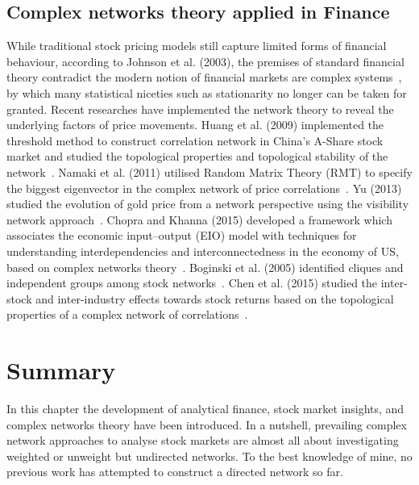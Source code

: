 
\subsection{Complex networks theory applied in Finance}
While traditional stock pricing models still capture limited forms of financial behaviour, according to Johnson et al. (2003), the premises of standard financial theory contradict the modern notion of financial markets are complex systems~\cite{financialcomplex}, by which many statistical niceties such as stationarity no longer can be taken for granted. Recent researches have implemented the network theory to reveal the underlying factors of price movements. Huang et al. (2009) implemented the threshold method to construct correlation network in China's A-Share stock market and studied the topological properties and topological stability of the network~\cite{chinesenetwork}. Namaki et al. (2011) utilised Random Matrix Theory (RMT) to specify the biggest eigenvector in the complex network of price correlations~\cite{genuine}. Yu (2013) studied the evolution of gold price from a network perspective using the visibility network approach~\cite{visibility}. Chopra and Khanna (2015) developed a framework which associates the economic input–output (EIO) model with techniques for understanding interdependencies and interconnectedness in the economy of US, based on complex networks theory~\cite{intercd}. Boginski et al. (2005) identified cliques and independent groups among stock networks~\cite{statisticalanalysis}.  Chen et al. (2015) studied the inter-stock and inter-industry effects towards stock returns based on the topological properties of a complex network of correlations~\cite{CHEN2015224}.

\section{Summary}
In this chapter the development of analytical finance, stock market insights, and complex networks theory have been introduced.
In a nutshell, prevailing complex network approaches to analyse stock markets are almost all about investigating weighted or unweight but undirected networks. To the best knowledge of mine, no previous work has attempted to construct a directed network so far.